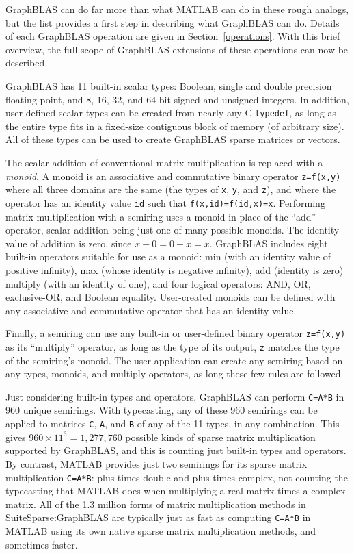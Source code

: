 \documentclass[12pt]{article}
\begin{document}
GraphBLAS can do far more than what MATLAB can do in these rough analogs, but
the list provides a first step in describing what GraphBLAS can do.  Details of
each GraphBLAS operation are given in Section~\ref{operations}.  With this
brief overview, the full scope of GraphBLAS extensions of these operations can
now be described.

GraphBLAS has 11 built-in scalar types: Boolean, single and double precision
floating-point, and 8, 16, 32, and 64-bit signed and unsigned integers.  In
addition, user-defined scalar types can be created from nearly any C
\verb'typedef', as long as the entire type fits in a fixed-size contiguous
block of memory (of arbitrary size).  All of these types can be used to create
GraphBLAS sparse matrices or vectors.

The scalar addition of conventional matrix multiplication is replaced with a
{\em monoid}.  A monoid is an associative and commutative binary operator
\verb'z=f(x,y)' where all three domains are the same (the types of \verb'x',
\verb'y', and \verb'z'), and where the operator has an identity value \verb'id'
such that \verb'f(x,id)=f(id,x)=x'.  Performing matrix multiplication with a
semiring uses a monoid in place of the ``add'' operator, scalar addition being
just one of many possible monoids.  The identity value of addition is zero,
since $x+0=0+x=x$.   GraphBLAS includes eight built-in operators suitable for
use as a monoid: min (with an identity value of positive infinity), max (whose
identity is negative infinity), add (identity is zero) multiply (with an
identity of one), and four logical operators: AND, OR, exclusive-OR, and
Boolean equality.  User-created monoids can be defined with any associative and
commutative operator that has an identity value.

Finally, a semiring can use any built-in or user-defined binary operator
\verb'z=f(x,y)' as its ``multiply'' operator, as long as the type of its
output, \verb'z' matches the type of the semiring's monoid.
The user application can create any semiring based on any types, monoids,
and multiply operators, as long these few rules are followed.

Just considering built-in types and operators, GraphBLAS can perform
\verb'C=A*B' in 960 unique semirings.  With typecasting, any of these 960
semirings can be applied to matrices \verb'C', \verb'A', and \verb'B' of any of
the 11 types, in any combination.  This gives $960 \times 11^3 = 1,277,760$
possible kinds of sparse matrix multiplication supported by GraphBLAS, and this
is counting just built-in types and operators.  By contrast, MATLAB provides
just two semirings for its sparse matrix multiplication \verb'C=A*B':
plus-times-double and plus-times-complex, not counting the typecasting that
MATLAB does when multiplying a real matrix times a complex matrix.  All of the
1.3 million forms of matrix multiplication methods in SuiteSparse:GraphBLAS are
typically just as fast as computing \verb'C=A*B' in MATLAB using its own native
sparse matrix multiplication methods, and sometimes faster.
\end{document}
